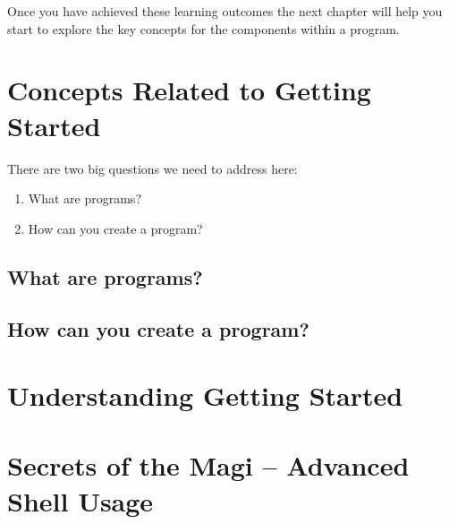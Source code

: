 Once you have achieved these learning outcomes the next chapter will help you start to explore the key concepts for the components within a program.


\section{Concepts Related to Getting Started}
\label{sec:concepts_related_to_getting_started}

There are two big questions we need to address here:

\begin{enumerate}
  \item What are programs?
  \item How can you create a program?
\end{enumerate}

\subsection{What are programs?}

\subsection{How can you create a program?}


\section{Understanding Getting Started}
\label{sec:understanding_getting_started}



\section{Secrets of the Magi -- Advanced Shell Usage}

